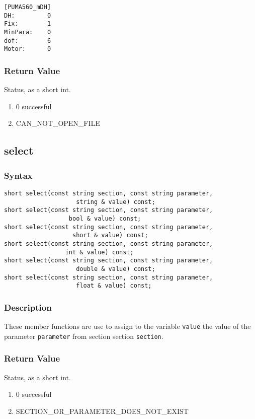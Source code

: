 \documentclass[11pt,fleqn,letterpaper]{report}
\begin{document}
\begin{verbatim}
[PUMA560_mDH]
DH:         0
Fix:        1
MinPara:    0
dof:        6
Motor:      0
\end{verbatim}

\subsubsection*{Return Value}
Status, as a short int.
\begin{enumerate}
\item[] 0 successful
\item[] CAN\_NOT\_OPEN\_FILE
\end{enumerate}
\newpage 

\subsection*{select}
\subsubsection*{Syntax}
\begin{verbatim}
short select(const string section, const string parameter,
                    string & value) const;
short select(const string section, const string parameter,
                  bool & value) const;
short select(const string section, const string parameter,
                   short & value) const;
short select(const string section, const string parameter,
                 int & value) const;
short select(const string section, const string parameter,
                    double & value) const;
short select(const string section, const string parameter,
                    float & value) const;
\end{verbatim}

\subsubsection*{Description}   
These member functions are use to assign to the variable
\texttt{value} the value of the parameter \texttt{parameter} from
section section \texttt{section}.

\subsubsection*{Return Value}
Status, as a short int.
\begin{enumerate}
\item[] 0 successful
\item[] SECTION\_OR\_PARAMETER\_DOES\_NOT\_EXIST
\end{enumerate}
 \newpage 
\end{document}
